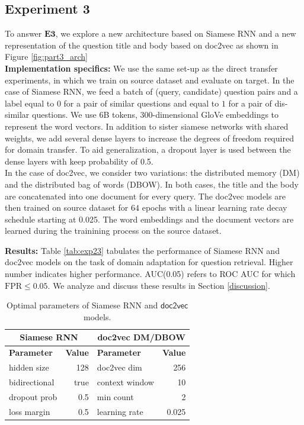 \documentclass{sigkddExp}
\begin{document}
\subsection{Experiment 3}
{\color{red}
To answer $\mathbf{E3}$, we explore a new architecture based on Siamese RNN and a new representation of the question title and body based on doc2vec as shown in Figure \ref{fig:part3_arch} \\}
\textbf{Implementation specifics:}
{\color{red} We use the same set-up as the direct transfer experiments, in which we train on source dataset and evaluate on target. In the case of Siamese RNN, we feed a batch of (query, candidate) question pairs and a label equal to $0$ for a pair of similar questions and equal to $1$ for a pair of dis-similar questions. We use 6B tokens, 300-dimensional GloVe embeddings to represent the word vectors. In addition to sister siamese networks with shared weights, we add several dense layers to increase the degrees of freedom required for domain transfer. To aid generalization, a dropout layer is used between the dense layers with keep probability of 0.5.\\

In the case of doc2vec, we consider two variations: the distributed memory (DM) and the distributed bag of words (DBOW). In both cases, the title and the body are concatenated into one document for every query. The doc2vec models are then trained on source dataset for $64$ epochs with a linear learning rate decay schedule starting at 0.025. The word embeddings and the document vectors are learned during the trainining process on the source dataset.}

\textbf{Results:} {\color{red} Table \ref{tab:exp23} tabulates the performance of Siamese RNN and doc2vec models on the task of domain adaptation for question retrieval. Higher number indicates higher performance. AUC(0.05) refers to ROC AUC for which $\mathrm{FPR} \leq 0.05$. We analyze and discuss these results in Section \ref{discussion}.}

\begin{table}[h]
 \begin{tabular}{l|r|l|r}
          \multicolumn{2}{c|}{\textbf{Siamese RNN}}
         & \multicolumn{2}{c}{\textbf{\textsf{doc2vec DM/DBOW}}}
         \\
         \toprule
         \textbf{Parameter}
         & \textbf{Value}
         & \textbf{Parameter}
         & \textbf{Value}
         \\
         \midrule
         hidden size
         & 128
         & doc2vec dim
         & 256
         \\
         bidirectional
         & true
         & context window
         & 10
         \\
         dropout prob
         & 0.5
         & min count
         & 2
         \\
         loss margin
         & 0.5
         & learning rate
         & 0.025
    \end{tabular}
    \caption{Optimal parameters of Siamese RNN and $\mathsf{doc2vec}$ models.}
    \label{tab:part3_params}
\end{table}
\end{document}
